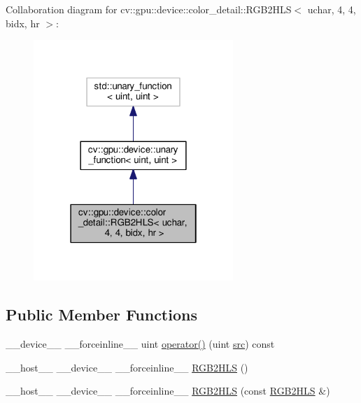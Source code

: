 Collaboration diagram for cv\-:\-:gpu\-:\-:device\-:\-:color\-\_\-detail\-:\-:R\-G\-B2\-H\-L\-S$<$ uchar, 4, 4, bidx, hr $>$\-:\nopagebreak
\begin{figure}[H]
\begin{center}
\leavevmode
\includegraphics[width=214pt]{structcv_1_1gpu_1_1device_1_1color__detail_1_1RGB2HLS_3_01uchar_00_014_00_014_00_01bidx_00_01hr_01_4__coll__graph}
\end{center}
\end{figure}
\subsection*{Public Member Functions}
\begin{DoxyCompactItemize}
\item 
\-\_\-\-\_\-device\-\_\-\-\_\- \-\_\-\-\_\-forceinline\-\_\-\-\_\- uint \hyperlink{structcv_1_1gpu_1_1device_1_1color__detail_1_1RGB2HLS_3_01uchar_00_014_00_014_00_01bidx_00_01hr_01_4_a722d51f3e17f3e60cf9d123053cd513b}{operator()} (uint \hyperlink{legacy_8hpp_a371cd109b74033bc4366f584edd3dacc}{src}) const 
\item 
\-\_\-\-\_\-host\-\_\-\-\_\- \-\_\-\-\_\-device\-\_\-\-\_\- \-\_\-\-\_\-forceinline\-\_\-\-\_\- \hyperlink{structcv_1_1gpu_1_1device_1_1color__detail_1_1RGB2HLS_3_01uchar_00_014_00_014_00_01bidx_00_01hr_01_4_a222cf8390e18d7f71c025b17aa69193c}{R\-G\-B2\-H\-L\-S} ()
\item 
\-\_\-\-\_\-host\-\_\-\-\_\- \-\_\-\-\_\-device\-\_\-\-\_\- \-\_\-\-\_\-forceinline\-\_\-\-\_\- \hyperlink{structcv_1_1gpu_1_1device_1_1color__detail_1_1RGB2HLS_3_01uchar_00_014_00_014_00_01bidx_00_01hr_01_4_aded39dc8a0b364f56c095bb1b85e16ee}{R\-G\-B2\-H\-L\-S} (const \hyperlink{structcv_1_1gpu_1_1device_1_1color__detail_1_1RGB2HLS}{R\-G\-B2\-H\-L\-S} \&)
\end{DoxyCompactItemize}


